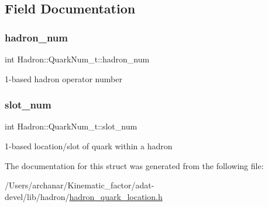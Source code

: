 \subsection{Field Documentation}
\mbox{\label{structHadron_1_1QuarkNum__t_a837a30c976c28b1b6d7c597e755b5900}} 
\subsubsection{\texorpdfstring{hadron\_num}{hadron\_num}}
{\footnotesize\ttfamily int Hadron\+::\+Quark\+Num\+\_\+t\+::hadron\+\_\+num}

1-\/based hadron operator number \mbox{\label{structHadron_1_1QuarkNum__t_a6d0d3b601e76b87d83358c5fda8a58b8}} 
\subsubsection{\texorpdfstring{slot\_num}{slot\_num}}
{\footnotesize\ttfamily int Hadron\+::\+Quark\+Num\+\_\+t\+::slot\+\_\+num}

1-\/based location/slot of quark within a hadron 

The documentation for this struct was generated from the following file\+:\begin{DoxyCompactItemize}
\item 
/\+Users/archanar/\+Kinematic\+\_\+factor/adat-\/devel/lib/hadron/\mbox{\hyperlink{adat-devel_2lib_2hadron_2hadron__quark__location_8h}{hadron\+\_\+quark\+\_\+location.\+h}}\end{DoxyCompactItemize}
